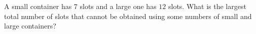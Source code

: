 A small container has $7$ slots and a large one has $12$ slots. What is the largest total number of slots that cannot be obtained using some numbers of small and large containers?
